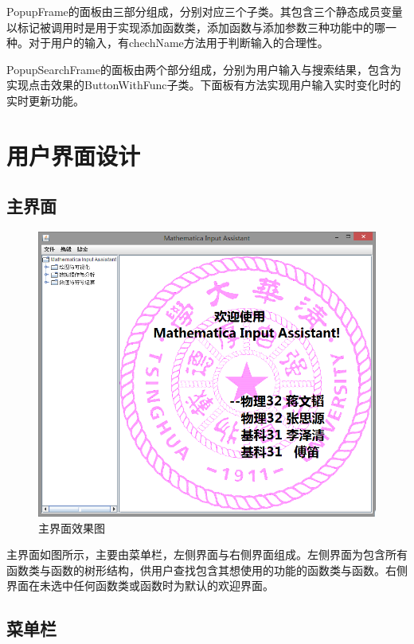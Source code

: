 \documentclass[hyperref, UTF8
,bookmarksnumbered=true, oneside]{ctexbook}
\begin{document}
			PopupFrame的面板由三部分组成，分别对应三个子类。其包含三个静态成员变量以标记被调用时是用于实现添加函数类，添加函数与添加参数三种功能中的哪一种。对于用户的输入，有chechName方法用于判断输入的合理性。

			PopupSearchFrame的面板由两个部分组成，分别为用户输入与搜索结果，包含为实现点击效果的ButtonWithFunc子类。下面板有方法实现用户输入实时变化时的实时更新功能。



\chapter{用户界面设计}

	\section{主界面} %

		\begin{figure}[!h]
			\centering
			\includegraphics[width=5in]{Welcome.png}
			\caption{主界面效果图}	
		\end{figure}

		主界面如图所示，主要由菜单栏，左侧界面与右侧界面组成。左侧界面为包含所有函数类与函数的树形结构，供用户查找包含其想使用的功能的函数类与函数。右侧界面在未选中任何函数类或函数时为默认的欢迎界面。
		
	\section{菜单栏} %
\end{document}
